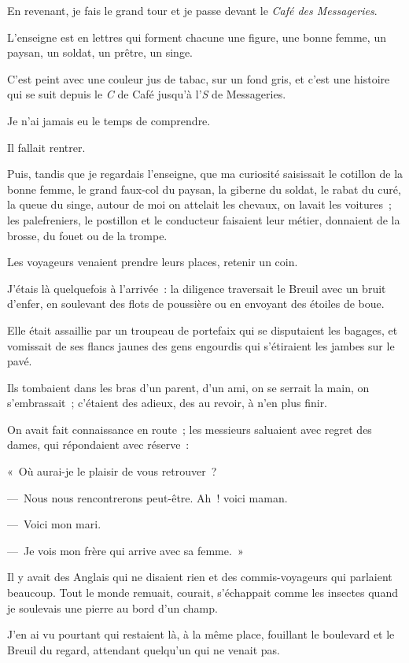 \documentclass[french,twoside]{book} %
\begin{document}
\noindent En revenant, je fais le grand tour et je passe devant le \emph{Café des Messageries}.\par
L’enseigne est en lettres qui forment chacune une figure, une bonne femme, un paysan, un soldat, un prêtre, un singe.\par
C’est peint avec une couleur jus de tabac, sur un fond gris, et c’est une histoire qui se suit depuis le \emph{C} de Café jusqu’à l’\emph{S} de Messageries.\par
Je n’ai jamais eu le temps de comprendre.\par
Il fallait rentrer.\par
Puis, tandis que je regardais l’enseigne, que ma curiosité saisissait le cotillon de la bonne femme, le grand faux-col du paysan, la giberne du soldat, le rabat du curé, la queue du singe, autour de moi on attelait les chevaux, on lavait les voitures ; les palefreniers, le postillon et le conducteur faisaient leur métier, donnaient de la brosse, du fouet ou de la trompe.\par
Les voyageurs venaient prendre leurs places, retenir un coin.\par
J’étais là quelquefois à l’arrivée : la diligence traversait le Breuil avec un bruit d’enfer, en soulevant des flots de poussière ou en envoyant des étoiles de boue.\par
Elle était assaillie par un troupeau de portefaix qui se disputaient les bagages, et vomissait de ses flancs jaunes des gens engourdis qui s’étiraient les jambes sur le pavé.\par
Ils tombaient dans les bras d’un parent, d’un ami, on se serrait la main, on s’embrassait ; c’étaient des adieux, des au revoir, à n’en plus finir.\par
On avait fait connaissance en route ; les messieurs saluaient avec regret des dames, qui répondaient avec réserve :\par
« Où aurai-je le plaisir de vous retrouver ?\par
— Nous nous rencontrerons peut-être. Ah ! voici maman.\par
— Voici mon mari.\par
— Je vois mon frère qui arrive avec sa femme. »\par
Il y avait des Anglais qui ne disaient rien et des commis-voyageurs qui parlaient beaucoup. Tout le monde remuait, courait, s’échappait comme les insectes quand je soulevais une pierre au bord d’un champ.\par
\bigbreak
\noindent J’en ai vu pourtant qui restaient là, à la même place, fouillant le boulevard et le Breuil du regard, attendant quelqu’un qui ne venait pas.\par
\end{document}
